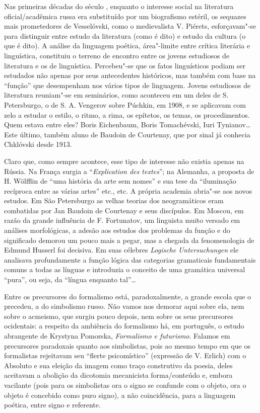 Nas primeiras décadas do século , enquanto o interesse social na
literatura oficial/acadêmica russa era substituído por um biografismo
estéril, os sequazes mais prometedores de Vesselóvski, como o
medievalista V. Piérets, esforçavam"-se para distinguir entre estudo da
literatura (como é dito) e estudo da cultura (o que é dito). A análise
da linguagem poética, área"-limite entre crítica literária e linguística,
constituiu o terreno de encontro entre os jovens estudiosos de
literatura e os de linguística. Percebeu"-se que os fatos linguísticos
podiam ser estudados não apenas por seus antecedentes históricos, mas
também com base na ``função'' que desempenham nos vários tipos de
linguagem. Jovens estudiosos de literatura reuniam"-se em seminários,
como aconteceu em um deles de S. Petersburgo, o de S. A. Vengerov sobre
Púchkin, em 1908, e se aplicavam com zelo a estudar o estilo, o ritmo, a
rima, os epítetos, os temas, os procedimentos. Quem estava entre eles?
Boris Eichenbaum, Boris Tomachévski, Iuri Tynianov\ldots{} Este último,
também aluno de Baudoin de Courtenay, que por sinal já conhecia
Chklóvski desde 1913.

Claro que, como sempre acontece, esse tipo de interesse não existia
apenas na Rússia. Na França surgia a ``\emph{Explication des textes}'';
na Alemanha, a proposta de H. Wölfflin de ``uma história da arte sem
nomes'' e sua tese da ``iluminação recíproca entre as várias artes''
etc., etc. A própria academia abria"-se aos novos estudos. Em São
Petersburgo as velhas teorias dos neogramáticos eram combatidas por Jan
Baudoin de Courtenay e seus discípulos. Em Moscou, em razão da grande
influência de F. Fortunatov, um linguista muito versado em análises
morfológicas, a adesão aos estudos dos problemas da função e do
significado demorou um pouco mais a pegar, mas a chegada da
fenomenologia de Edmund Husserl foi decisiva. Em suas célebres
\emph{Logische} \emph{Untersuchungen} ele analisava profundamente a
função lógica das categorias gramaticais fundamentais comuns a todas as
línguas e introduzia o conceito de uma gramática universal ``pura'', ou
seja, da ``língua enquanto tal''\ldots{}

Entre os precursores do formalismo está, paradoxalmente, a grande escola
que o precedeu, a do simbolismo russo. Não vamos nos demorar aqui sobre
ela, nem sobre o acmeismo, que surgiu pouco depois, nem sobre os seus
precursores ocidentais: a respeito da ambiência do formalismo há, em
português, o estudo abrangente de Krystyna Pomorska, \emph{Formalismo e
futurismo}. Falamos em precursores paradoxais quanto aos simbolistas,
pois ao mesmo tempo em que os formalistas rejeitavam seu ``flerte
psicomístico'' (expressão de V. Erlich) com o Absoluto e sua eleição da
imagem como traço construtivo da poesia, deles aceitavam a abolição da
dicotomia mecanicista forma/conteúdo e, embora vacilante (pois para os
simbolistas ora o signo se confunde com o objeto, ora o objeto é
concebido como puro signo), a não coincidência, para a linguagem
poética, entre signo e referente.

